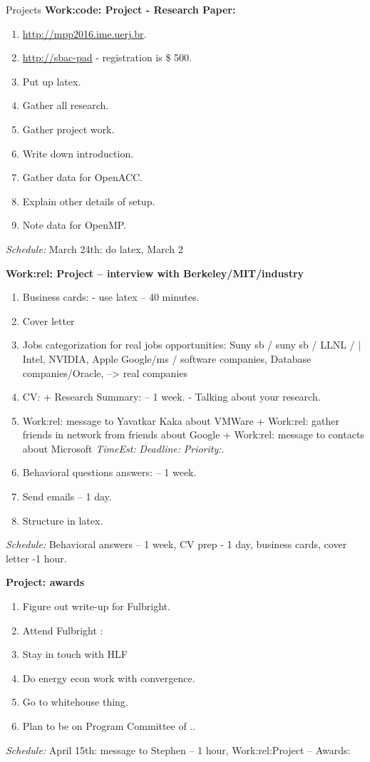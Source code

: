 \documentclass[serif, mathserif, final]{beamer}
\newcommand{\te}[1]{\textit{TimeEst:}\textit{#1}}
\newcommand{\dl}[1]{\textit{Deadline:}\textit{#1}}
\newcommand{\pr}[1]{\textit{Priority:}\textit{#1}}
\begin{document}
\begin{frame}
\begin{columns}
\begin{block}{Projects}
{\bf Work:code: Project - Research Paper:}  
\begin{enumerate} 
\item \tiny \url{http://mpp2016.ime.uerj.br}. 
\item \tiny \url {http://sbac-pad}  - registration is  \$ 500. 
\item \tiny Put up latex.  
\item \tiny Gather all research. 
\item \tiny Gather project work. 
\item \tiny Write down introduction.
\item \tiny Gather data for OpenACC. 
\item \tiny Explain other details of setup. 
\item \tiny Note data for OpenMP. 
\end{enumerate} 
\textit{Schedule:} March 24th: do latex, March 2

{\bf Work:rel: Project – interview with Berkeley/MIT/industry} 
\begin{enumerate} 
\tiny \item \tiny Business cards:  - use latex  -- 40 minutes. 
\tiny \item \tiny Cover letter 
\tiny \item \tiny Jobs categorization for real jobs opportunities: 
Suny sb / suny sb / LLNL /  |  Intel, NVIDIA, Apple  Google/ms /
software companies, Database companies/Oracle,  --> real companies 
\tiny \item \tiny CV: + Research Summary:  -- 1 week.  - Talking about
  your research.
\item \tiny Work:rel: message to Yavatkar Kaka about VMWare +
  Work:rel: gather friends in network from friends about Google +
  Work:rel: message to contacts about Microsoft \te{} \dl{} \pr{}. 
\item \tiny Behavioral questions answers:    -- 1 week. 
\item \tiny Send emails – 1 day. 
\item \tiny Structure in latex. 
\end{enumerate}  
\textit{Schedule:} Behavioral answers – 1 week, CV prep - 1 day,
business cards, cover letter -1 hour. 


{\bf Project: awards}
\begin{enumerate} 
\tiny \item \tiny Figure out write-up for Fulbright. 
\item \tiny Attend Fulbright : 
\item \tiny Stay in touch with HLF 
\item \tiny Do energy econ work with convergence. 
\item \tiny Go to whitehouse thing. 
\item \tiny Plan to be on Program Committee of .. 
\end{enumerate} 
\textit{Schedule:} April 15th: message to Stephen – 1 hour,
Work:rel:Project – Awards: 


\end{block}
\end{columns}
\end{frame}
\end{document}
